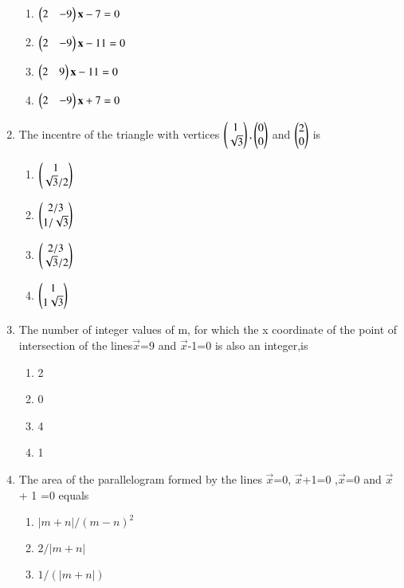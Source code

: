 \begin{enumerate}
    \begin{enumerate}
     \item $\begin{pmatrix}2 & -9\end{pmatrix}\mathbf{x} - 7 = 0$
     \item $\begin{pmatrix}2 & -9\end{pmatrix}\mathbf{x} - 11 = 0$
     \item $\begin{pmatrix}2 & 9\end{pmatrix}\mathbf{x} - 11 = 0$
     \item $\begin{pmatrix}2 & -9\end{pmatrix}\mathbf{x} + 7 = 0$
    \end{enumerate}
    \item The incentre of the triangle with vertices $\begin{pmatrix}1\\\sqrt{3}\end{pmatrix},\begin{pmatrix}0\\0\end{pmatrix}$ and $\begin{pmatrix}2\\0\end{pmatrix}$ is 
    \begin{enumerate}
     \item  $\begin{pmatrix}1\\\sqrt3/2\end{pmatrix}$
     \item  $\begin{pmatrix}2/3\\1/\sqrt3\end{pmatrix}$
     \item  $\begin{pmatrix}2/3\\ \sqrt3/2\end{pmatrix}$
     \item  $\begin{pmatrix}1\\1\sqrt3\end{pmatrix}$
     \end{enumerate}
    \item The number of integer values of m, for which the x coordinate of the point of intersection of the lines$\vec {x}$=9 and $\vec {x}$-1=0  is also an integer,is
    \begin{enumerate}
     \item  2
     \item  0
     \item  4
     \item  1
     \end{enumerate}
    \item The area of the parallelogram formed by the lines $\vec {x}$=0, $\vec {x}$+1=0 ,$\vec {x}$=0 and $\vec {x}$+ 1 =0 equals
    \begin{enumerate}
     \item $\vert m+n\vert /(m-n)^2$
     \item $2/\vert m+n\vert$
     \item $1/(\vert m+n\vert)$

\end{enumerate}
\end{enumerate}
